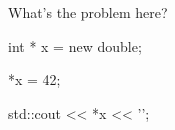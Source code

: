 What's the problem here?



\begin{consolethree}[escapeinside=||]

int * x = new double;

*x = 42;

std::cout << *x << '\n';

\end{consolethree}

